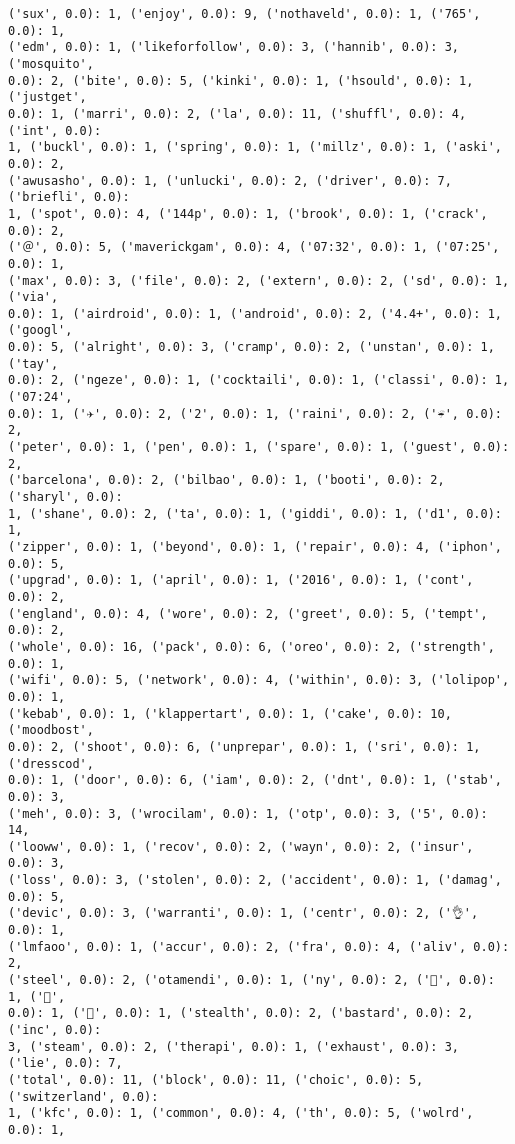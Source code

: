 \documentclass[11pt]{article}
\begin{document}
\begin{Verbatim}[commandchars=\\\{\}]
('sux', 0.0): 1, ('enjoy', 0.0): 9, ('nothaveld', 0.0): 1, ('765', 0.0): 1,
('edm', 0.0): 1, ('likeforfollow', 0.0): 3, ('hannib', 0.0): 3, ('mosquito',
0.0): 2, ('bite', 0.0): 5, ('kinki', 0.0): 1, ('hsould', 0.0): 1, ('justget',
0.0): 1, ('marri', 0.0): 2, ('la', 0.0): 11, ('shuffl', 0.0): 4, ('int', 0.0):
1, ('buckl', 0.0): 1, ('spring', 0.0): 1, ('millz', 0.0): 1, ('aski', 0.0): 2,
('awusasho', 0.0): 1, ('unlucki', 0.0): 2, ('driver', 0.0): 7, ('briefli', 0.0):
1, ('spot', 0.0): 4, ('144p', 0.0): 1, ('brook', 0.0): 1, ('crack', 0.0): 2,
('＠', 0.0): 5, ('maverickgam', 0.0): 4, ('07:32', 0.0): 1, ('07:25', 0.0): 1,
('max', 0.0): 3, ('file', 0.0): 2, ('extern', 0.0): 2, ('sd', 0.0): 1, ('via',
0.0): 1, ('airdroid', 0.0): 1, ('android', 0.0): 2, ('4.4+', 0.0): 1, ('googl',
0.0): 5, ('alright', 0.0): 3, ('cramp', 0.0): 2, ('unstan', 0.0): 1, ('tay',
0.0): 2, ('ngeze', 0.0): 1, ('cocktaili', 0.0): 1, ('classi', 0.0): 1, ('07:24',
0.0): 1, ('✈', 0.0): 2, ('️2', 0.0): 1, ('raini', 0.0): 2, ('☔', 0.0): 2,
('peter', 0.0): 1, ('pen', 0.0): 1, ('spare', 0.0): 1, ('guest', 0.0): 2,
('barcelona', 0.0): 2, ('bilbao', 0.0): 1, ('booti', 0.0): 2, ('sharyl', 0.0):
1, ('shane', 0.0): 2, ('ta', 0.0): 1, ('giddi', 0.0): 1, ('d1', 0.0): 1,
('zipper', 0.0): 1, ('beyond', 0.0): 1, ('repair', 0.0): 4, ('iphon', 0.0): 5,
('upgrad', 0.0): 1, ('april', 0.0): 1, ('2016', 0.0): 1, ('cont', 0.0): 2,
('england', 0.0): 4, ('wore', 0.0): 2, ('greet', 0.0): 5, ('tempt', 0.0): 2,
('whole', 0.0): 16, ('pack', 0.0): 6, ('oreo', 0.0): 2, ('strength', 0.0): 1,
('wifi', 0.0): 5, ('network', 0.0): 4, ('within', 0.0): 3, ('lolipop', 0.0): 1,
('kebab', 0.0): 1, ('klappertart', 0.0): 1, ('cake', 0.0): 10, ('moodbost',
0.0): 2, ('shoot', 0.0): 6, ('unprepar', 0.0): 1, ('sri', 0.0): 1, ('dresscod',
0.0): 1, ('door', 0.0): 6, ('iam', 0.0): 2, ('dnt', 0.0): 1, ('stab', 0.0): 3,
('meh', 0.0): 3, ('wrocilam', 0.0): 1, ('otp', 0.0): 3, ('5', 0.0): 14,
('looww', 0.0): 1, ('recov', 0.0): 2, ('wayn', 0.0): 2, ('insur', 0.0): 3,
('loss', 0.0): 3, ('stolen', 0.0): 2, ('accident', 0.0): 1, ('damag', 0.0): 5,
('devic', 0.0): 3, ('warranti', 0.0): 1, ('centr', 0.0): 2, ('👌', 0.0): 1,
('lmfaoo', 0.0): 1, ('accur', 0.0): 2, ('fra', 0.0): 4, ('aliv', 0.0): 2,
('steel', 0.0): 2, ('otamendi', 0.0): 1, ('ny', 0.0): 2, ('🚖', 0.0): 1, ('🗽',
0.0): 1, ('🌃', 0.0): 1, ('stealth', 0.0): 2, ('bastard', 0.0): 2, ('inc', 0.0):
3, ('steam', 0.0): 2, ('therapi', 0.0): 1, ('exhaust', 0.0): 3, ('lie', 0.0): 7,
('total', 0.0): 11, ('block', 0.0): 11, ('choic', 0.0): 5, ('switzerland', 0.0):
1, ('kfc', 0.0): 1, ('common', 0.0): 4, ('th', 0.0): 5, ('wolrd', 0.0): 1,

\end{Verbatim}
\end{document}
